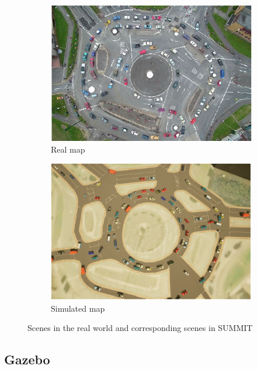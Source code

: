 \documentclass[12pt,twoside,a4paper,parskip]{scrbook} %
\begin{document}
\begin{figure}[h]
  \centering
  \begin{subfigure}{0.49\textwidth}
    \centering
    \includegraphics[width=\linewidth]{Images/Summit_org.png}
    \caption{Real map}
    \label{fig:summit_or}
  \end{subfigure}
  \hfill
  \begin{subfigure}{0.49\textwidth}
    \centering
    \includegraphics[width=\linewidth]{Images/Summit_sim.png}
    \caption{Simulated map}
    \label{fig:summit_sim}
  \end{subfigure}
  \caption{Scenes in the real world and corresponding scenes in SUMMIT}
  \label{fig:summit_both}
\end{figure}

\subsection{Gazebo}
\end{document}
